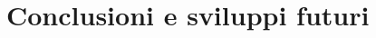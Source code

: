 \documentclass[11pt]{article}
\begin{document}
\newpage 

\section{Conclusioni e sviluppi futuri}






\newpage
\printbibliography	
\end{document}

